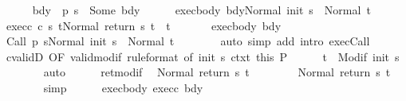 \begin{isabellebody}
\ \ \ \ \isamarkupfalse%
\ bdy{\isacharcolon}\ {\isachardoublequoteopen}{\isasymGamma}\ {\isacharparenleft}p\ s{\isacharparenright}\ {\isacharequal}\ Some\ bdy{\isachardoublequoteclose}\isanewline
\ \ \ \ \isamarkupfalse%
\ exec{\isacharunderscore}body{\isacharcolon}\ {\isachardoublequoteopen}{\isasymGamma}{\isasymturnstile}{\isasymlangle}bdy{\isacharcomma}Normal\ {\isacharparenleft}init\ s{\isacharparenright}{\isasymrangle}\ {\isasymRightarrow}\ Normal\ t{\isacharprime}{\isachardoublequoteclose}\ \isanewline
\ \ \ \ \isamarkupfalse%
\ exec{\isacharunderscore}c{\isacharcolon}\ {\isachardoublequoteopen}{\isasymGamma}{\isasymturnstile}{\isasymlangle}c\ s\ t{\isacharprime}{\isacharcomma}Normal\ {\isacharparenleft}return\ s\ t{\isacharprime}{\isacharparenright}{\isasymrangle}\ {\isasymRightarrow}\ t{\isachardoublequoteclose}\ \isanewline
\ \ \ \ \isamarkupfalse%
\ exec{\isacharunderscore}body\ bdy\isanewline
\ \ \ \ \isamarkupfalse%
\ {\isachardoublequoteopen}{\isasymGamma}{\isasymturnstile}{\isasymlangle}Call\ {\isacharparenleft}p\ s{\isacharparenright}{\isacharcomma}Normal\ {\isacharparenleft}init\ s{\isacharparenright}{\isasymrangle}\ {\isasymRightarrow}\ Normal\ t{\isacharprime}{\isachardoublequoteclose}\isanewline
\ \ \ \ \ \ \isamarkupfalse%
\ {\isacharparenleft}auto\ simp\ add{\isacharcolon}\ intro{\isacharcolon}\ exec{\isachardot}Call{\isacharparenright}\isanewline
\ \ \ \ \isamarkupfalse%
\ cvalidD\ {\isacharbrackleft}OF\ valid{\isacharunderscore}modif{\isacharprime}\ {\isacharbrackleft}rule{\isacharunderscore}format{\isacharcomma}\ of\ {\isachardoublequoteopen}init\ s{\isachardoublequoteclose}{\isacharbrackright}\ ctxt{\isacharprime}\ this{\isacharbrackright}\ P\isanewline
\ \ \ \ \isamarkupfalse%
\ {\isachardoublequoteopen}t{\isacharprime}\ {\isasymin}\ Modif\ {\isacharparenleft}init\ s{\isacharparenright}{\isachardoublequoteclose}\isanewline
\ \ \ \ \ \ \isamarkupfalse%
\ auto\isanewline
\ \ \ \ \isamarkupfalse%
\ ret{\isacharunderscore}modif\ \isamarkupfalse%
\ {\isachardoublequoteopen}Normal\ {\isacharparenleft}return{\isacharprime}\ s\ t{\isacharprime}{\isacharparenright}\ {\isacharequal}\ \isanewline
\ \ \ \ \ \ Normal\ {\isacharparenleft}return\ s\ t{\isacharprime}{\isacharparenright}{\isachardoublequoteclose}\isanewline
\ \ \ \ \ \ \isamarkupfalse%
\ simp\isanewline
\ \ \ \ \isamarkupfalse%
\ exec{\isacharunderscore}body\ exec{\isacharunderscore}c\ bdy\isanewline

\end{isabellebody}
